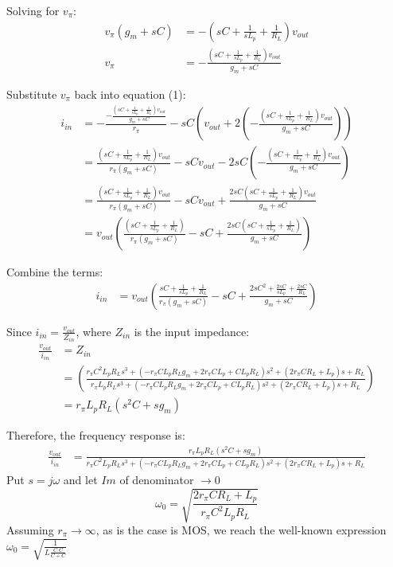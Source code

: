 Solving for \(v_{\pi}\):
\begin{align*}
    v_{\pi}(g_m + sC) &= -\left( sC + \frac{1}{sL_p} + \frac{1}{R_L} \right)v_{out} \\
    v_{\pi} &= -\frac{\left( sC + \frac{1}{sL_p} + \frac{1}{R_L} \right)v_{out}}{g_m + sC}
\end{align*}

Substitute \(v_{\pi}\) back into equation (1):
\begin{align*}
    i_{in} &= -\frac{-\frac{\left( sC + \frac{1}{sL_p} + \frac{1}{R_L} \right)v_{out}}{g_m + sC}}{r_{\pi}} - sC\left( v_{out} + 2\left( -\frac{\left( sC + \frac{1}{sL_p} + \frac{1}{R_L} \right)v_{out}}{g_m + sC} \right) \right) \\
    &= \frac{\left( sC + \frac{1}{sL_p} + \frac{1}{R_L} \right)v_{out}}{r_{\pi}(g_m + sC)} - sCv_{out} - 2sC\left( -\frac{\left( sC + \frac{1}{sL_p} + \frac{1}{R_L} \right)v_{out}}{g_m + sC} \right) \\
    &= \frac{\left( sC + \frac{1}{sL_p} + \frac{1}{R_L} \right)v_{out}}{r_{\pi}(g_m + sC)} - sCv_{out} + \frac{2sC\left( sC + \frac{1}{sL_p} + \frac{1}{R_L} \right)v_{out}}{g_m + sC} \\
    &= v_{out} \left( \frac{\left( sC + \frac{1}{sL_p} + \frac{1}{R_L} \right)}{r_{\pi}(g_m + sC)} - sC + \frac{2sC\left( sC + \frac{1}{sL_p} + \frac{1}{R_L} \right)}{g_m + sC} \right)
\end{align*}

Combine the terms:
\begin{align*}
    i_{in} &= v_{out} \left( \frac{sC + \frac{1}{sL_p} + \frac{1}{R_L}}{r_{\pi}(g_m + sC)} - sC + \frac{2sC^2 + \frac{2sC}{sL_p} + \frac{2sC}{R_L}}{g_m + sC} \right)
\end{align*}

Since \(i_{in} = \frac{v_{out}}{Z_{in}}\), where \(Z_{in}\) is the input impedance:
\begin{align*}
    \frac{v_{out}}{i_{in}} &= Z_{in} \\
    &= \left( \frac{r_{\pi}C^2L_pR_Ls^3 + (-r_{\pi}CL_pR_Lg_m + 2r_{\pi}CL_p + CL_pR_L)s^2 + (2r_{\pi}CR_L + L_p)s + R_L}{r_{\pi}L_pR_Ls^3 + (-r_{\pi}CL_pR_Lg_m + 2r_{\pi}CL_p + CL_pR_L)s^2 + (2r_{\pi}CR_L + L_p)s + R_L} \right) \\
    &= r_{\pi}L_pR_L \left( s^2C + s g_m \right)
\end{align*}

Therefore, the frequency response is:
\begin{align}
    \frac{v_{out}}{i_{in}} &= \frac{r_{\pi}L_pR_L (s^2C + s g_m)}{r_{\pi}C^2L_pR_Ls^3 + (-r_{\pi}CL_pR_Lg_m + 2r_{\pi}CL_p + CL_pR_L)s^2 + (2r_{\pi}CR_L + L_p)s + R_L} \tag{3}
\end{align}
Put \(s = j\omega\) and let \(Im\) of denominator \(\to0\)
\begin{equation}
  \omega_0 = \sqrt{\frac{2r_\pi CR_L + L_p}{r_\pi C^2 L_p R_L}}
\end{equation}
Assuming \(r_\pi \to\infty\), as is the case is MOS, we reach the well-known expression \(\omega_0 = \sqrt{\frac{1}{L\frac{C.C}{C+C}}}\)

